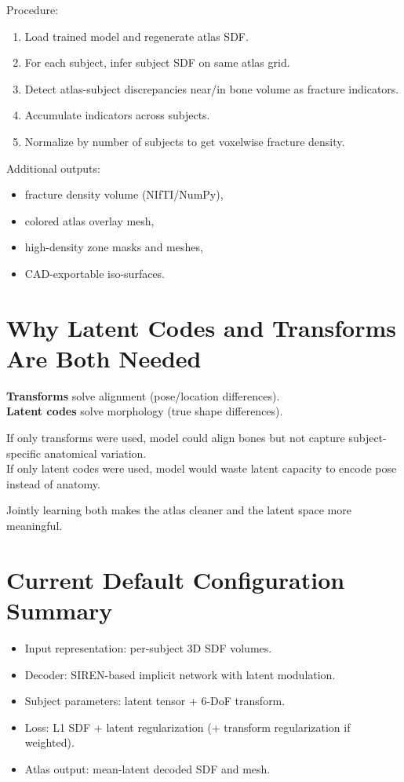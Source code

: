 ﻿\documentclass[11pt]{article}
\begin{document}
Procedure:
\begin{enumerate}[leftmargin=*]
    \item Load trained model and regenerate atlas SDF.
    \item For each subject, infer subject SDF on same atlas grid.
    \item Detect atlas-subject discrepancies near/in bone volume as fracture indicators.
    \item Accumulate indicators across subjects.
    \item Normalize by number of subjects to get voxelwise fracture density.
\end{enumerate}

Additional outputs:
\begin{itemize}[leftmargin=*]
    \item fracture density volume (NIfTI/NumPy),
    \item colored atlas overlay mesh,
    \item high-density zone masks and meshes,
    \item CAD-exportable iso-surfaces.
\end{itemize}

\section{Why Latent Codes and Transforms Are Both Needed}
\textbf{Transforms} solve alignment (pose/location differences).  \\
\textbf{Latent codes} solve morphology (true shape differences).

If only transforms were used, model could align bones but not capture subject-specific anatomical variation.  \\
If only latent codes were used, model would waste latent capacity to encode pose instead of anatomy.

Jointly learning both makes the atlas cleaner and the latent space more meaningful.

\section{Current Default Configuration Summary}
\begin{itemize}[leftmargin=*]
    \item Input representation: per-subject 3D SDF volumes.
    \item Decoder: SIREN-based implicit network with latent modulation.
    \item Subject parameters: latent tensor + 6-DoF transform.
    \item Loss: L1 SDF + latent regularization (+ transform regularization if weighted).
    \item Atlas output: mean-latent decoded SDF and mesh.
\end{itemize}
\end{document}
